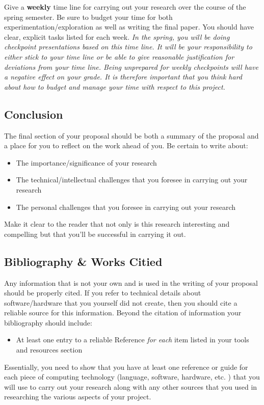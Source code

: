 \documentclass[10pt]{article}
\begin{document}
Give a \textbf{weekly} time line for carrying out your research over the course of the spring semester.  Be sure to budget your time for both experimentation/exploration as well as writing the final paper.  You should have clear, explicit tasks listed for each week.  \textit{In the spring, you will be doing checkpoint presentations based on this time line. It will be your responsibility to either stick to your time line or be able to give reasonable justification for deviations from your time line.  Being unprepared for weekly checkpoints will have a negative effect on your grade.  It is therefore important that you think hard about how to budget and manage your time with respect to this project. } 

\subsection{Conclusion}

The final section of your proposal should be both a summary of the proposal and a place for you to reflect on the work ahead of you.  Be certain to write about:
\begin{itemize}
\item The importance/significance of your research
\item The technical/intellectual challenges that you foresee in carrying out your research
\item The personal challenges that you foresee in carrying out your research
\end{itemize}
Make it clear to the reader that not only is this research interesting and compelling but that you'll be successful in carrying it out.  

\subsection{Bibliography \& Works Citied}

Any information that is not your own and is used in the writing of your proposal should be properly cited.  If you refer to technical details about software/hardware that you yourself did not create, then you should cite a reliable source for this information.  Beyond the citation of information your bibliography should include:
\begin{itemize}
\item At least one entry to a reliable Reference \textit{for each} item listed in your tools and resources section  
\end{itemize}
Essentially, you need to show that you have at least one reference or guide for each piece of computing technology (language, software, hardware, etc. ) that you will use to carry out your research along with any other sources that you used in researching the various aspects of your project.
\end{document}
